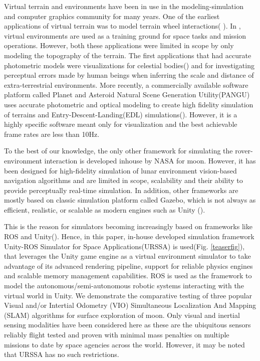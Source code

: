 \documentclass[a4paper, 10pt, conference]{ieeeconf}      %
\begin{document}
Virtual terrain and environments have been in use in the modeling-simulation and computer graphics community for many years. One of the earliest applications of virtual terrain was to model terrain wheel interactions( \cite{yang2007realistic,yang2008virtual,ding2008design,gao2012virtual}). In \cite{andreev2018creating}, virtual environments are used as a training ground for space tasks and mission operations. However, both these applications were limited in scope by only modeling the topography of the terrain. The first applications that had accurate photometric models were visualizations for celestial bodies(\cite{van2011investigation,wright2011preparing, jensen2001physically}) and for investigating perceptual errors made by human beings when inferring the scale and distance of extra-terrestrial environments\cite{oravetz2011slope}. More recently, a commercially available software platform called Planet and Asteroid Natural Scene Generation Utility(PANGU) uses accurate photometric and optical modeling  to create high fidelity simulation of terrains and Entry-Descent-Landing(EDL) simulations(\cite{dunstan2018pangu,martin2019planetary}). However, it is a highly specific software meant only for visualization and the best achievable frame rates are less than 10Hz. 

To the best of our knowledge, the only other framework for simulating the rover-environment interaction is developed inhouse by NASA\cite{allan2019planetary} for moon. However, it has been designed for high-fidelity simulation of lunar environment vision-based navigation algorithms and are limited in scope, scalability and their ability to provide perceptually real-time simulation. In addition, other frameworks are mostly based on classic simulation platform called Gazebo\cite{koenig2004design}, which is not always as efficient, realistic, or scalable as modern engines such as Unity (\cite{engine2008unity, konrad2019simulation}). 

This is the reason for simulators becoming increasingly based on frameworks like ROS\cite{quigley2009ros} and Unity(\cite{babaians2018ros2unity3d,bischoffm_2019_06}). Hence, in this paper, in-house developed simulation framework Unity-ROS Simulator for Space Applications(URSSA)\cite{msm2020rss} is used(Fig. \ref{teaserfig}), that leverages the Unity game engine as a virtual environment simulator to take advantage of its advanced rendering pipeline, support for reliable physics engines and scalable memory management capabilities. ROS is used as the framework to model the autonomous/semi-autonomous robotic systems interacting with the virtual world in Unity. We demonstrate the comparative testing of three popular Visual and/or Intertial Odometry (VIO)\cite{roumeliotis2002augmenting} Simultaneous Localization And Mapping (SLAM)\cite{durrant1996localization} algorithms for surface exploration of moon. Only visual and inertial sensing modalities have been considered here as these are the ubiquitous sensors reliably flight tested and proven with minimal mass penalties on multiple missions to date by space agencies across the world. However, it may be noted that URSSA has no such restrictions.
\end{document}
